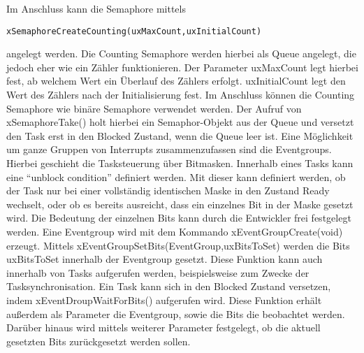 Im Anschluss kann die Semaphore mittels
\begin{lstlisting}[numbers = none]
xSemaphoreCreateCounting(uxMaxCount,uxInitialCount) 
\end{lstlisting}
angelegt werden. Die Counting Semaphore werden hierbei als Queue angelegt, die jedoch eher wie ein Zähler funktionieren. Der Parameter uxMaxCount legt hierbei fest, ab welchem Wert ein Überlauf des Zählers erfolgt. uxInitialCount legt den Wert des Zählers nach der Initialisierung fest. Im Anschluss können die Counting Semaphore wie binäre Semaphore verwendet werden. Der Aufruf von xSemaphoreTake() holt hierbei ein Semaphor-Objekt aus der Queue und versetzt den Task erst in den Blocked Zustand, wenn die Queue leer ist.
Eine Möglichkeit um ganze Gruppen von Interrupts zusammenzufassen sind die Eventgroups. Hierbei geschieht die Tasksteuerung über Bitmasken. Innerhalb eines Tasks kann eine "`unblock condition"' definiert werden. Mit dieser kann definiert werden, ob der Task nur bei einer vollständig identischen Maske in den Zustand Ready wechselt, oder ob es bereits ausreicht, dass ein einzelnes Bit in der Maske gesetzt wird. Die Bedeutung der einzelnen Bits kann durch die Entwickler frei festgelegt werden. Eine Eventgroup wird mit dem Kommando xEventGroupCreate(void) erzeugt. Mittels xEventGroupSetBits(EventGroup,uxBitsToSet) werden die Bits uxBitsToSet innerhalb der Eventgroup gesetzt. Diese Funktion kann auch innerhalb von Tasks aufgerufen werden, beispielsweise zum Zwecke der Tasksynchronisation. Ein Task kann sich in den Blocked Zustand versetzen, indem xEventDroupWaitForBits() aufgerufen wird. Diese Funktion erhält außerdem als Parameter die Eventgroup, sowie die Bits die beobachtet werden. Darüber hinaus wird mittels weiterer Parameter festgelegt, ob die aktuell gesetzten Bits zurückgesetzt werden sollen.
